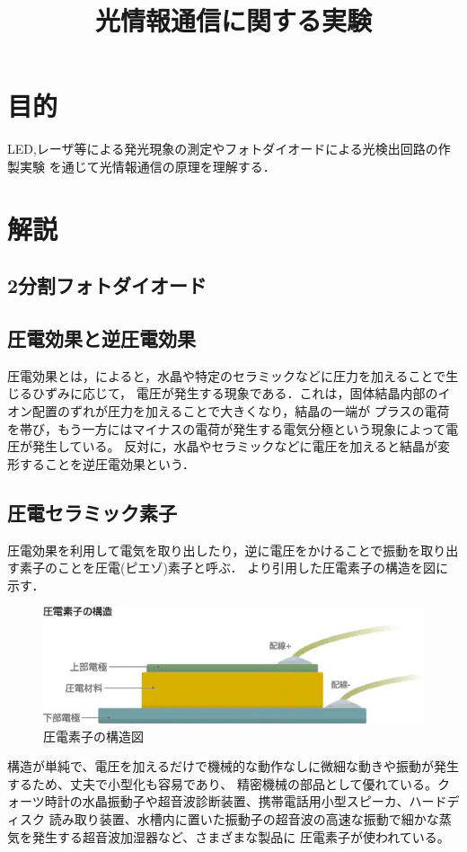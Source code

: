 \documentclass{ltjsarticle}
\title{光情報通信に関する実験}
\begin{document}
\maketitle

\section{目的}
	LED,レーザ等による発光現象の測定やフォトダイオードによる光検出回路の作製実験
	を通じて光情報通信の原理を理解する．

\section{解説}
	\subsection{2分割フォトダイオード}
	\subsection{圧電効果と逆圧電効果}
		圧電効果とは，\cite{ref:圧電効果}によると，水晶や特定のセラミックなどに圧力を加えることで生じるひずみに応じて，
		電圧が発生する現象である．これは，固体結晶内部のイオン配置のずれが圧力を加えることで大きくなり，結晶の一端が
		プラスの電荷を帯び，もう一方にはマイナスの電荷が発生する電気分極という現象によって電圧が発生している。
		反対に，水晶やセラミックなどに電圧を加えると結晶が変形することを逆圧電効果という．
	\subsection{圧電セラミック素子}
		圧電効果を利用して電気を取り出したり，逆に電圧をかけることで振動を取り出す素子のことを圧電(ピエゾ)素子と呼ぶ．
		\cite{ref:圧電効果}より引用した圧電素子の構造を図に示す．
		\begin{figure}[H]
		\centering
		\includegraphics[width = 12cm]{figs/kl080302u.jpg}
		\caption{圧電素子の構造図}
		\label{fig:圧電素子}
		\end{figure}
		構造が単純で、電圧を加えるだけで機械的な動作なしに微細な動きや振動が発生するため、丈夫で小型化も容易であり、
		精密機械の部品として優れている。クォーツ時計の水晶振動子や超音波診断装置、携帯電話用小型スピーカ、ハードディスク
		読み取り装置、水槽内に置いた振動子の超音波の高速な振動で細かな蒸気を発生する超音波加湿器など、さまざまな製品に
		圧電素子が使われている。
\clearpage
\end{document}

